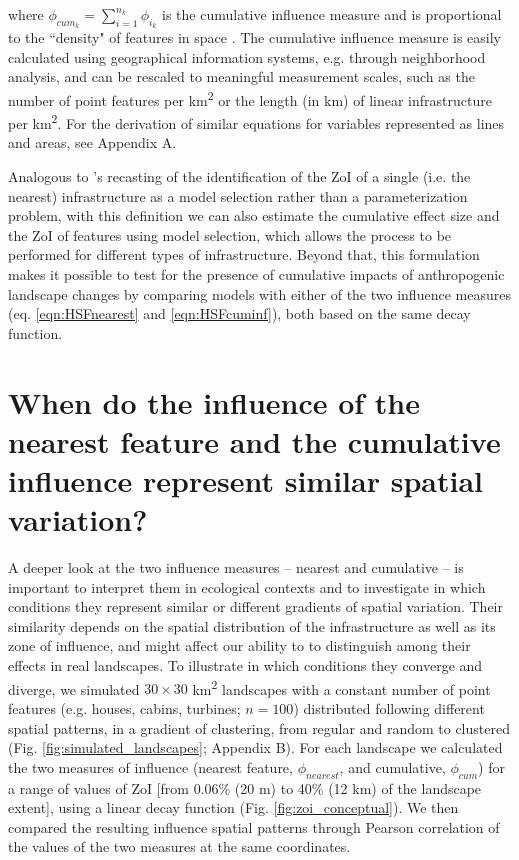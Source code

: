 \documentclass[titlepage]{article}
\begin{document}
where $\phi_{cum_k} = \sum_{i=1}^{n_k} \phi_{i_k}$ is the cumulative influence measure and is proportional to 
the ``density" of features in space \citep[e.g.][]{panzacchi_searching_2015}. The cumulative influence measure is easily calculated using geographical information systems, e.g. through neighborhood analysis, and can be rescaled to meaningful measurement scales, such as the number of point features per km\textsuperscript{2} or the length (in km) of linear infrastructure per km\textsuperscript{2}. For the derivation of similar equations for variables represented as lines and areas, see Appendix A.

Analogous to \citet{lee_estimating_2020}'s recasting of the identification of the ZoI of a single (i.e. the nearest) infrastructure as a model selection rather than a parameterization problem, with this definition we can also estimate the cumulative effect size and the ZoI of features using model selection, which allows the process to be performed for different types of infrastructure. Beyond that, this formulation makes it possible to test for the presence of cumulative impacts of anthropogenic landscape changes by comparing models with either of the two influence measures (eq. \ref{eqn:HSFnearest} and \ref{eqn:HSFcuminf}), both based on the same decay function.

\section{When do the influence of the nearest feature and the cumulative influence represent similar spatial variation?}

A deeper look at the two influence measures -- nearest and cumulative -- is important to interpret them in ecological contexts and to investigate in which conditions they represent similar or different gradients of spatial variation. Their similarity depends on the spatial distribution of the infrastructure as well as its zone of influence, and might affect our ability to to distinguish among their effects in real landscapes. To illustrate in which conditions they converge and diverge, we simulated $30 \times 30$ km\textsuperscript{2} landscapes with a constant number of point features (e.g. houses, cabins, turbines; $n = 100$) distributed following different spatial patterns, in a gradient of clustering, from regular and random to clustered (Fig. \ref{fig:simulated_landscapes}; Appendix B). For each landscape we calculated the two measures of influence (nearest feature, $\phi_{nearest}$, and cumulative, $\phi_{cum}$) for a range of values of ZoI [from 0.06\% (20 m) to 40\% (12 km) of the landscape extent], using a linear decay function (Fig. \ref{fig:zoi_conceptual}). We then compared the resulting influence spatial patterns through Pearson correlation of the values of the two measures at the same coordinates. 
\end{document}
